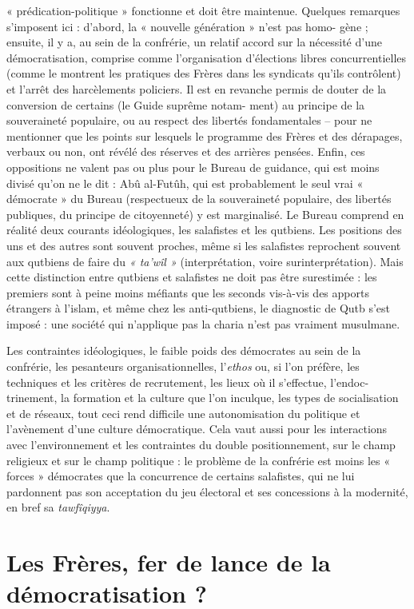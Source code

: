 « prédication-politique » fonctionne et doit être maintenue. Quelques
remarques s'imposent ici : d'abord, la « nouvelle génération » n'est pas
homo- gène ; ensuite, il y a, au sein de la confrérie, un relatif accord
sur la nécessité d'une démocratisation, comprise comme l'organisation
d'élections libres concurrentielles (comme le montrent les pratiques des
Frères dans les syndicats qu'ils contrôlent) et l'arrêt des harcèlements
policiers. Il est en revanche permis de douter de la conversion de
certains (le Guide suprême notam- ment) au principe de la souveraineté
populaire, ou au respect des libertés fondamentales -- pour ne
mentionner que les points sur lesquels le programme des Frères et des
dérapages, verbaux ou non, ont révélé des réserves et des arrières
pensées. Enfin, ces oppositions ne valent pas ou plus pour le Bureau de
guidance, qui est moins divisé qu'on ne le dit : Abû al-Futûh, qui est
probablement le seul vrai « démocrate » du Bureau (respectueux de la
souveraineté populaire, des libertés publiques, du principe de
citoyenneté) y est marginalisé. Le Bureau comprend en réalité deux
courants idéologiques, les salafistes et les qutbiens. Les positions des
uns et des autres sont souvent proches, même si les salafistes
reprochent souvent aux qutbiens de faire du \emph{« ta'wîl »}
(interprétation, voire surinterprétation). Mais cette distinction entre
qutbiens et salafistes ne doit pas être surestimée : les premiers sont à
peine moins méfiants que les seconds vis-à-vis des apports étrangers à
l'islam, et même chez les anti-qutbiens, le diagnostic de Qutb s'est
imposé : une société qui n'applique pas la charia n'est pas vraiment
musulmane.

Les contraintes idéologiques, le faible poids des démocrates au sein de
la
confrérie, les pesanteurs organisationnelles, l'\emph{ethos} ou, si l'on
préfère, les techniques et les critères de recrutement, les lieux où il
s'effectue, l'endoc- trinement, la formation et la culture que l'on
inculque, les types de socialisation et de réseaux, tout ceci rend
difficile une autonomisation du politique et l'avènement d'une culture
démocratique. Cela vaut aussi pour les interactions avec l'environnement
et les contraintes du double positionnement, sur le champ religieux et
sur le champ politique : le problème de la confrérie est moins les «
forces » démocrates que la concurrence de certains salafistes, qui
ne lui pardonnent pas son acceptation du jeu électoral et ses
concessions à la modernité, en bref sa \emph{tawfîqiyya}.
 

\hypertarget{les-fruxe8res-fer-de-lance-de-la-duxe9mocratisation}{%
\section{Les Frères, fer de lance de la démocratisation
?}\label{les-fruxe8res-fer-de-lance-de-la-duxe9mocratisation}}

